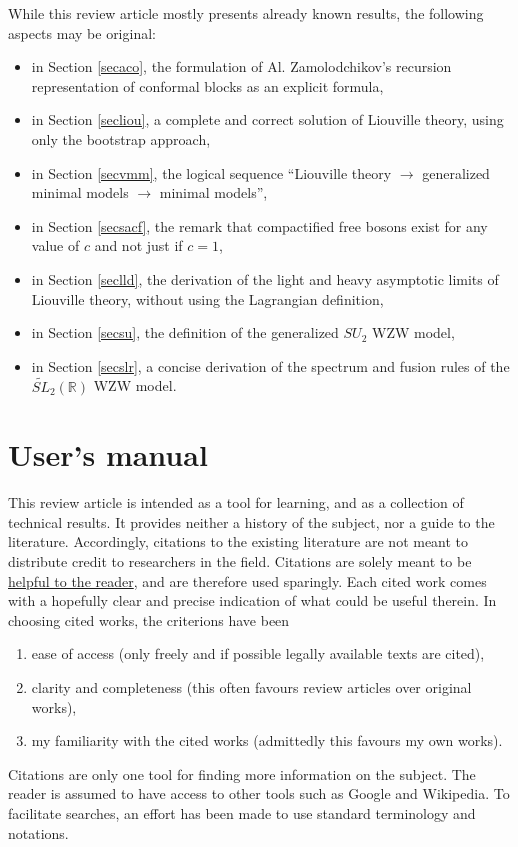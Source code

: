 \documentclass[12pt, a4paper, notitlepage, twoside]{report}
\numberwithin{equation}{section}
\theoremstyle{break}
\begin{document}
While this review article mostly presents already known results, the following aspects may be original:
\begin{itemize}
\item in Section \ref{secaco}, the formulation of Al. Zamolodchikov's recursion representation of conformal blocks as an explicit formula,
\item in Section \ref{secliou}, a complete and correct solution of Liouville theory, using only the bootstrap approach, 
\item in Section \ref{secvmm}, the logical sequence ``Liouville theory $\rightarrow$ generalized minimal models $\rightarrow$ minimal models'',
\item in Section \ref{secsacf}, the remark that compactified free bosons exist for any value of $c$ and not just if $c=1$,
\item in Section \ref{seclld}, the derivation of the light and heavy asymptotic limits of Liouville theory, without using the Lagrangian definition,
\item in Section \ref{secsu}, the definition of the generalized $SU_2$ WZW model,
\item in Section \ref{secslr}, a concise derivation of the spectrum and fusion rules of the $\widetilde{SL}_2(\mathbb{R})$ WZW model.
\end{itemize}


\section{User's manual}

This review article is intended as a tool for learning, and as a collection of technical results.
It provides neither a history of the subject, nor a guide to the literature.
Accordingly, citations to the existing literature are not meant to distribute credit to researchers in the field.
Citations are solely meant to be 
\href{http://researchpracticesandtools.blogspot.fr/2013/08/write-for-humans-not-for-robots.html}
{helpful to the reader}, and are therefore used sparingly.
Each cited work comes with a hopefully clear and precise indication of what could be useful therein.
In choosing cited works, the criterions have been
\begin{enumerate}
\item ease of access (only freely and if possible legally available texts are cited), 
\item clarity and completeness (this often favours review articles over original works),
\item my familiarity with the cited works (admittedly this favours my own works). 
\end{enumerate}
Citations are only one tool for finding more information on the subject. 
The reader is assumed to have access to other tools such as Google and Wikipedia. 
To facilitate searches, an effort has been made to use standard terminology and notations. 
\end{document}
